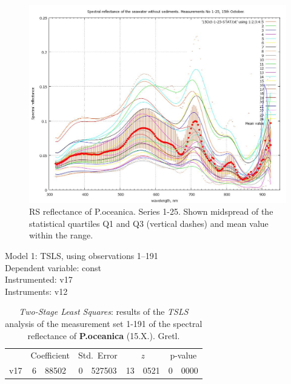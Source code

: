 \documentclass[10pt, a4paper]{article}
\begin{document}
\begin{appendices}
\begin{figure}[H]
\begin{center}
\includegraphics[scale=0.25]{GNU-12.jpg}
\caption{RS reflectance of P.oceanica. Series 1-25. Shown midspread of the statistical quartiles Q1 and Q3 (vertical dashes) and
mean value within the range.­}
\label{fig:55}
\end{center}
\end{figure}


\begin{table}[htbp]
\caption{\textit{Two-Stage Least Squares}: results of the \textit{TSLS} analysis of the measurement set 1-191 of the spectral reflectance of \textbf{P.oceanica} (15.X.). Gretl.}
\begin{center}
Model 1: TSLS, using observations 1--191\\
Dependent variable: const\\
Instrumented: v17 \\
Instruments: v12 \\

\vspace{1em}

\begin{tabular}{lr@{.}lr@{.}lr@{.}lr@{.}l}
  &
 \multicolumn{2}{c}{Coefficient} &
  \multicolumn{2}{c}{Std.\ Error} &
   \multicolumn{2}{c}{$z$} &
    \multicolumn{2}{c}{p-value} \\[1ex]
v17 &  6 & 88502 & 0 & 527503 & 13 & 0521 & 0 & 0000 \\
\end{tabular}


\end{center}
\end{table}
\end{appendices}
\end{document}
